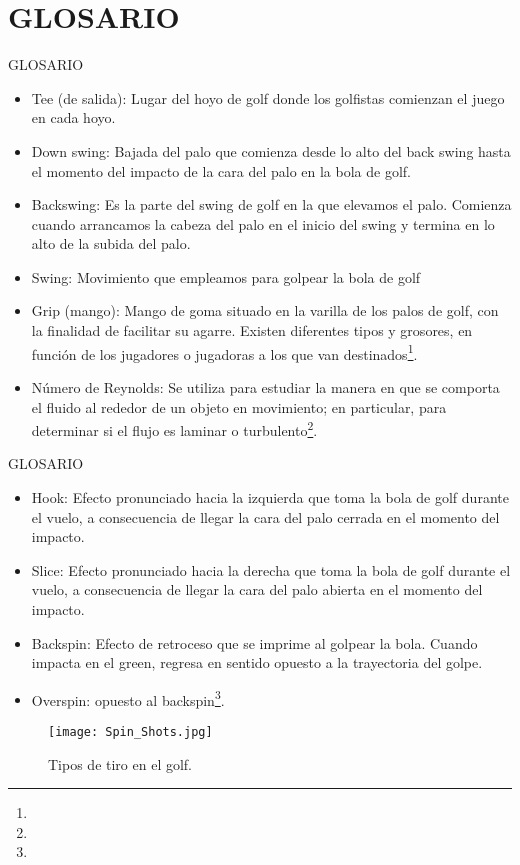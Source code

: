 \section{GLOSARIO}
\begin{frame}{GLOSARIO}
	\begin{itemize}
		\item Tee (de salida): Lugar del hoyo de golf donde los golfistas comienzan el juego en cada hoyo.
  	    \item Down swing: Bajada del palo que comienza desde lo alto del back swing hasta el momento del impacto de la cara del palo en la bola de golf.
        \item Backswing: Es la parte del swing de golf en la que elevamos el palo. Comienza cuando arrancamos la cabeza del palo en el inicio del swing y termina en lo alto de la subida del palo.
        \item Swing: Movimiento que empleamos para golpear la bola de golf 
        
            \item Grip (mango): Mango de goma situado en la varilla de los palos de golf, con la finalidad de facilitar su agarre. Existen diferentes tipos y grosores, en función de los jugadores o jugadoras a los que van destinados\footnote{}.
        \item Número de Reynolds: Se utiliza para estudiar la manera en que se comporta el fluido al rededor de un objeto en movimiento; en particular, para determinar si el flujo es laminar o turbulento\footnote{}.
	\end{itemize}
\end{frame}
\begin{frame}{GLOSARIO}
\begin{itemize}
			\item Hook: Efecto pronunciado hacia la izquierda que toma la bola de golf durante el vuelo, a consecuencia de llegar la cara del palo cerrada en el momento del impacto.
            \item Slice: Efecto pronunciado hacia la derecha que toma la bola de golf durante el vuelo, a consecuencia de llegar la cara del palo abierta en el momento del impacto.
            \item Backspin: Efecto de retroceso que se imprime al golpear la bola. Cuando impacta en el green, regresa en sentido opuesto a la trayectoria del golpe.
            \item Overspin: opuesto al backspin\footnote{\vspace{-0.3cm}}.
\end{itemize}
    \begin{figure}[H]
      \centering
      \texttt{[image: Spin\_Shots.jpg]}
      \caption{Tipos de tiro en el golf.}
	\end{figure}
\end{frame}








